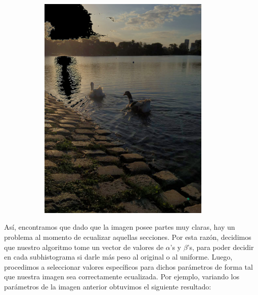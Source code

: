 \documentclass[10pt, a4paper]{article}
\begin{document}
\begin{figure}[H]
\begin{subfigure}{0.5\textwidth}
        \includegraphics[width=0.9\textwidth]{patitos1_ecualizada.png}
    \end{subfigure}\hfill	
\end{figure}

Así, encontramos que dado que la imagen posee partes muy claras, hay un problema al momento de ecualizar aquellas secciones. Por esta razón, decidimos que nuestro algoritmo tome un vector de valores de $\alpha$'s y $\beta$'s, para poder decidir en cada subhistograma si darle más peso al original o al uniforme. 
Luego, procedimos a seleccionar valores específicos para dichos parámetros de forma tal que nuestra imagen sea  correctamente ecualizada. Por ejemplo, variando los parámetros de la imagen anterior obtuvimos el siguiente resultado:
\end{document}
